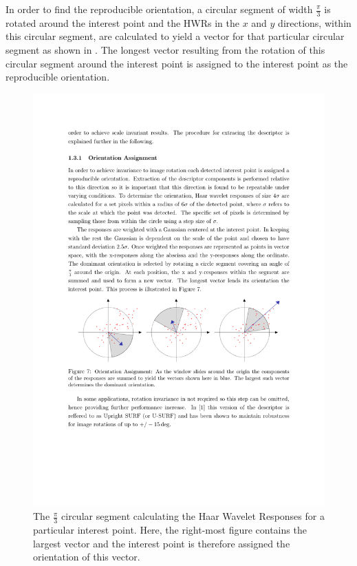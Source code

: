 \documentclass{article}
\begin{document}
In order to find the reproducible orientation, a circular segment of width $\frac{\pi}{3}$ is rotated around the interest point and the HWRs in the $x$ and $y$ directions, within this circular segment, are calculated to yield a vector for that particular circular segment as shown in  \cite{Evans2009}. The longest vector resulting from the rotation of this circular segment around the interest point is assigned to the interest point as the reproducible orientation.\\

\begin{figure}[h!] 
  \centering
    \includegraphics[width=1.0\textwidth]{../Drawings/methods/SURF2D_orientation_assignment.pdf}
    \caption{The $\frac{\pi}{3}$ circular segment calculating the Haar Wavelet Responses for a particular interest point. Here, the right-most figure contains the largest vector and the interest point is therefore assigned the orientation of this vector.}
    \label{fig:circularSegment}
\end{figure}
\end{document}
